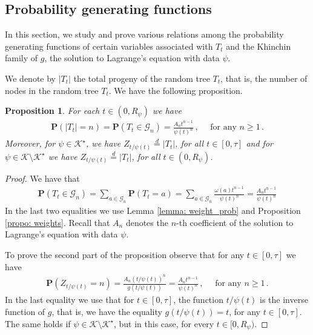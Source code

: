 \documentclass[11pt,a4paper,leqno]{amsart}
\theoremstyle{plain}
\newtheorem{propo}[theo]{Proposition}
\theoremstyle{definition}
\numberwithin{equation}{section}
\def\P{\mathbf{P}}
\def\K{\mathcal{K}}
\begin{document}
	\subsection{Probability generating functions} In this section, we study and prove various relations among the probability generating functions of certain variables associated with \( T_t \) and the Khinchin family of $g$, the solution to Lagrange's equation with data \( \psi \).
	\smallskip
	
	
	We denote by $|T_t|$ the total progeny of the random tree $T_t$, that is, the number of nodes in the random tree $T_t$. We have the following proposition. 
	\begin{propo}\label{propo: total_progeny}For each $t \in (0,R_{\psi})$ we have 
		\begin{align*}
			\P(|T_t| = n) = \P(T_t \in \mathcal{G}_n) = \frac{A_nt^{n-1}}{\psi(t)^n}\,, \quad \text{ for any } n \geq 1\,.
		\end{align*}
		Moreover, for \(\psi\in\mathcal K^\star\), we have \(Z_{t/\psi(t)}\stackrel{d}{=}|T_t|\), for all \(t\in[0,\tau]\) and for $\psi \in \K \setminus \K^{\star}$ we have \(Z_{t/\psi(t)}\stackrel{d}{=}|T_t|\), for all $t \in (0,R_{\psi})$.
	\end{propo}
	\begin{proof} We have that
		\begin{align*}
			\P(T_t \in \mathcal{G}_n) = \sum_{a \in \mathcal{G}_n}\P(T_t = a) = \sum_{a \in \mathcal{G}_n}\frac{\omega(a)t^{n-1}}{\psi(t)^n} = \frac{A_n t^{n-1}}{\psi(t)^n}
		\end{align*}
		In the last two equalities we use Lemma \ref{lemma: weight_prob} and Proposition \ref{propo: weights}. Recall that $A_n$ denotes the $n$-th coefficient of the solution to Lagrange's equation with data $\psi$.
		\smallskip
		
		To prove the second part of the proposition observe that for any $t \in [0,\tau]$ we have
		\begin{align*}
			\P(Z_{t/\psi(t)} = n) = \frac{A_n (t/\psi(t))^n}{g(t/\psi(t))} = \frac{A_n t^{n-1}}{\psi(t)^n}\,, \quad \text{ for any } n \geq 1\,.
		\end{align*}
		In the last equality we use that for $t \in [0,\tau]$, the function $t/\psi(t)$ is the inverse function of $g$, that is, we have the equality $g(t/\psi(t)) = t$, for any $t \in [0,\tau]$. The same holds if $\psi \in \K \setminus \K^{\star}$, but in this case, for every $t \in [0, R_{\psi})$.
	\end{proof}
	
\end{document}

